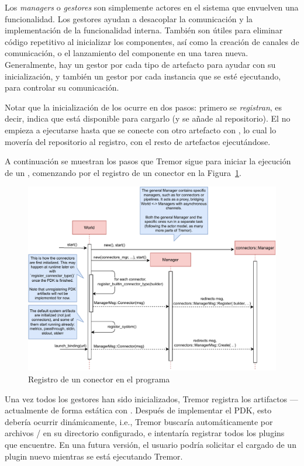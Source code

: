 Los \emph{managers} o \emph{gestores} son simplemente actores en el sistema que
envuelven una funcionalidad. Los gestores ayudan a desacoplar la comunicación y
la implementación de la funcionalidad interna. También son útiles para eliminar
código repetitivo al inicializar los componentes, así como la creación de
canales de comunicación, o el lanzamiento del componente en una tarea nueva.
Generalmente, hay un gestor por cada tipo de artefacto para ayudar con su
inicialización, y también un gestor por cada instancia que se esté ejecutando,
para controlar su comunicación.

Notar que la inicialización de los \connectors ocurre en dos pasos: primero se
\emph{registran}, es decir, indica que está disponible para cargarlo (y se añade
al repositorio). El \connector no empieza a ejecutarse hasta que se conecte con
otro artefacto con , lo cual lo movería del repositorio al
registro, con el resto de artefactos ejecutándose.

A continuación se muestran los pasos que Tremor sigue para iniciar la ejecución
de un \connector, comenzando por el registro de un conector en la
Figura~\ref{fig:tremor_registering}.

\begin{figure}
    \centering
    \includegraphics[width=\textwidth]{./Imagenes/registering.pdf}
    \caption{Registro de un conector en el programa}%
    \label{fig:tremor_registering}
\end{figure}

Una vez todos los gestores han sido inicializados, Tremor registra los
artifactos --- actualmente de forma estática con .
Después de implementar el PDK, esto debería ocurrir dinámicamente, i.e., Tremor
buscaría automáticamente por archivos / en su directorio
configurado, e intentaría registrar todos los plugins que encuentre. En una
futura versión, el usuario podría solicitar el cargado de un plugin nuevo
mientras se está ejecutando Tremor.

